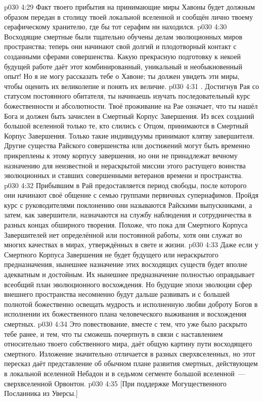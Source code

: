 \vs p030 4:29 Факт твоего прибытия на принимающие миры Хавоны будет должным образом передан в столицу твоей локальной вселенной и сообщён лично твоему серафическому хранителю, где бы тот серафим ни находился.
\vs p030 4:30 Восходящие смертные были тщательно обучены делам эволюционных миров пространства; теперь они начинают свой долгий и плодотворный контакт с созданными сферами совершенства. Какую прекрасную подготовку к некоей будущей работе даёт этот комбинированный, уникальный и необыкновенный опыт! Но я не могу рассказать тебе о Хавоне; ты должен увидеть эти миры, чтобы оценить их великолепие и понять их величие.
\vs p030 4:31 . Достигнув Рая со статусом постоянного обитателя, ты начинаешь изучать последовательный курс божественности и абсолютности. Твоё проживание на Рае означает, что ты нашёл Бога и должен быть зачислен в Смертный Корпус Завершения. Из всех созданий большой вселенной только те, кто слились с Отцом, принимаются в Смертный Корпус Завершения. Только такие индивидуумы принимают клятву завершителя. Другие существа Райского совершенства или достижений могут быть временно прикреплены к этому корпусу завершения, но они не принадлежат вечному назначению для неизвестной и нераскрытой миссии этого растущего воинства эволюционных и ставших совершенными ветеранов времени и пространства.
\vs p030 4:32 Прибывшим в Рай предоставляется период свободы, после которого они начинают своё общение с семью группами первичных супернафимов. Пройдя курс с руководителями поклонению они называются Райскими выпускниками, а затем, как завершители, назначаются на службу наблюдения и сотрудничества в разных концах обширного творения. Похоже, что пока для Смертного Корпуса Завершителей нет определённой или постоянной работы, хотя они служат во многих качествах в мирах, утверждённых в свете и жизни.
\vs p030 4:33 Даже если у Смертного Корпуса Завершения не будет будущего или нераскрытого предназначения, нынешнее назначение этих восходящих существ будет вполне адекватным и достойным. Их нынешнее предназначение полностью оправдывает всеобщий план эволюционного восхождения. Но будущие эпохи эволюции сфер внешнего пространства несомненно будут дальше развивать и с большей полнотой божественно освещать мудрость и исполненную любви доброту Богов в исполнении их божественного плана человеческого выживания и восхождения смертных.
\vs p030 4:34 \pc Это повествование, вместе с тем, что уже было раскрыто тебе ранее, и тем, что ты сможешь почерпнуть в связи с наставлением относительно твоего собственного мира, даёт общую картину пути восходящего смертного. Изложение значительно отличается в разных сверхвселенных, но этот пересказ даёт представление об обычном плане развития смертных, действующем в локальной вселенной Небадон и в седьмом сегменте большой вселенной~--- сверхвселенной Орвонтон.
\vsetoff
\vs p030 4:35 [При поддержке Могущественного Посланника из Уверсы.]
\quizlink
